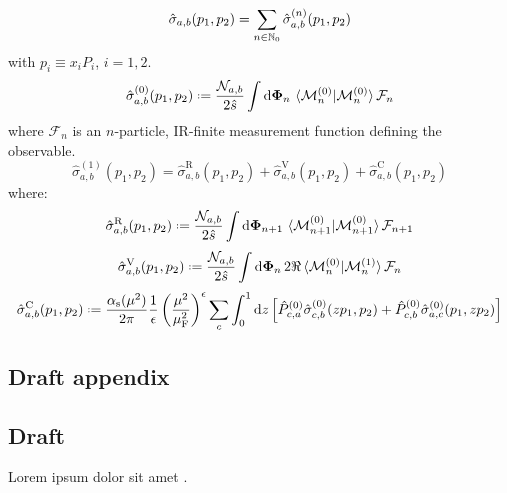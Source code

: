 \documentclass[a4paper, 12pt]{book}
\newcommand{\ren}{\mu}
\newcommand{\fac}{\mu_\text{F}}
\newcommand{\rc}{\alpha_\text{s}}
\newcommand{\lps}{\dd \bs{\Phi}}
\newcommand{\me}{\mathcal{M}}
\newcommand{\pcs}{\hat{\sigma}}
\newcommand{\de}{\epsilon}
\begin{document}
\begin{equation}
  \pcs_{a,b}(p_1 , p_2) = \sum_{n \in \N_0} \pcs_{a,b}^{(n)}(p_1 , p_2)
\end{equation}
with $ p_i \equiv x_i P_i $, $ i = 1,2 $.
\begin{equation}
  \pcs_{a,b}^{(0)}(p_1 , p_2) \defeq \frac{\mathcal{N}_{a,b}}{2\hat{s}} \int \lps_n \, \braket{\me_n^{(0)} | \me_n^{(0)}} \mathcal{F}_n
\end{equation}
where $ \mathcal{F}_n $ is an $ n $-particle, IR-finite measurement function defining the observable.
\begin{equation}
  \pcs_{a,b}^{(1)}(p_1 , p_2) = \pcs_{a,b}^\text{R}(p_1 , p_2) + \pcs_{a,b}^\text{V}(p_1 , p_2) + \pcs_{a,b}^\text{C}(p_1 , p_2)
\end{equation}
where:
\begin{equation}
  \pcs_{a,b}^\text{R}(p_1 , p_2) \defeq \frac{\mathcal{N}_{a,b}}{2\hat{s}} \int \lps_{n+1} \, \braket{\me_{n+1}^{(0)} | \me_{n+1}^{(0)}} \mathcal{F}_{n+1}
\end{equation}
\begin{equation}
  \pcs_{a,b}^\text{V}(p_1 , p_2) \defeq \frac{\mathcal{N}_{a,b}}{2\hat{s}} \int \lps_n \, 2\Re \braket{\me_n^{(0)} | \me_n^{(1)}} \mathcal{F}_n
\end{equation}
\begin{equation}
  \pcs_{a,b}^\text{C}(p_1 , p_2) \defeq \frac{\rc(\ren^2)}{2\pi} \frac{1}{\de} \left( \frac{\ren^2}{\fac^2} \right)^\de \sum_c \int_0^1 \dd z \left[ \hat{P}_{c,a}^{(0)} \pcs_{c,b}^{(0)}(z p_1 , p_2) + \hat{P}_{c,b}^{(0)} \pcs_{a,c}^{(0)}(p_1 , z p_2) \right]
\end{equation}

\clearpage

\begin{appendices}
\pagestyle{append}

\chapter{Draft appendix}

\section{Draft}

Lorem ipsum dolor sit amet \cite{pauli}.

\clearpage
\end{appendices}

\pagestyle{biblio}
\printbibliography[heading = bibintoc, title = {Bibliography}]
\end{document}
